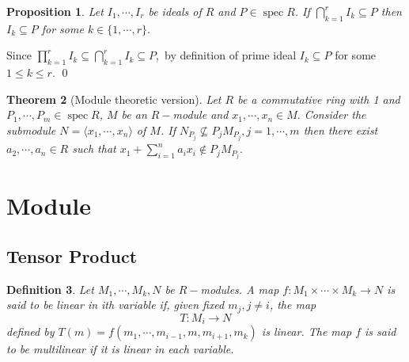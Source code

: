 \documentclass[11pt]{amsart}
\newtheorem{theorem}{Theorem}[section]
\newtheorem{defn}[theorem]{Definition}
\newtheorem{prop}[theorem]{Proposition}
\newcommand{\gen}[1]{\langle#1\rangle}
\DeclareMathOperator{\spec}{\text{spec}}
\begin{document}
\begin{prop}

Let $I_1,\cdots, I_r$ be ideals of $R$ and $P\in\spec R$. If $\displaystyle\bigcap_{k=1}^r I_k\subseteq P$ then $I_k\subseteq P$ for some $k\in\{1,\cdots,r\}.$

\end{prop}

\proof Since $\displaystyle\prod_{k=1}^r I_k\subseteq \displaystyle\bigcap_{k=1}^r I_k\subseteq P,$ by definition of prime ideal $I_k\subseteq P$ for some $1\leq k\leq r.$ \qed

\begin{theorem}[Module theoretic version]

Let $R$ be a commutative ring with 1 and $P_1,\cdots, P_m\in\spec R$, $M$ be an $R-$module and $x_1,\cdots,x_n\in M.$ Consider the submodule $N=\gen{x_1,\cdots, x_n}$ of $M$. If $N_{P_j}\nsubseteq P_jM_{P_j},j=1,\cdots,m$ then there exist $a_2,\cdots,a_n\in R$ such that $x_1+\displaystyle\sum_{i=1}^n a_ix_i\notin P_jM_{P_j}.$

\end{theorem}

\proof




















\newpage
\section{Module}

\subsection{Tensor Product}

\begin{defn}

Let $M_1,\cdots,M_k,N$ be $R-$modules. A map $f:M_1\times \cdots\times M_k\to N$ is said to be linear in ith variable if, given fixed $m_j,j\neq i$, the map $$T:M_i\to N$$ defined by $T(m)=f(m_1,\cdots,m_{i-1},m,m_{i+1},m_k)$ is linear. The map $f$ is said to be multilinear if it is linear in each variable.

\end{defn}
\end{document}
